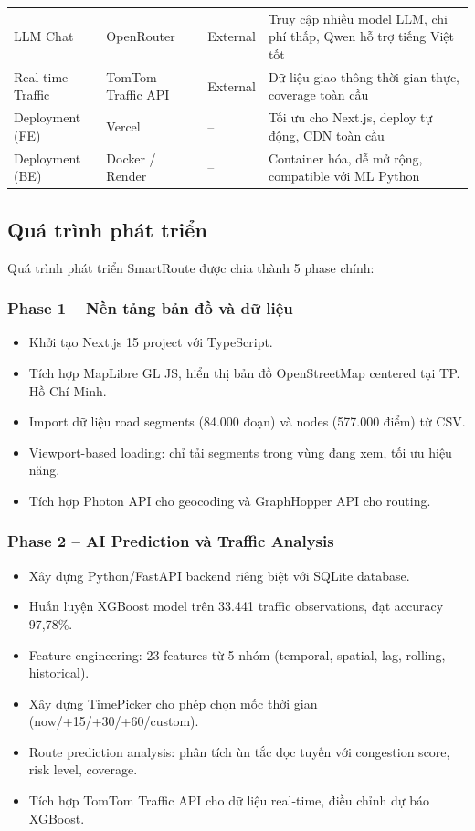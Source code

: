 \documentclass[12pt,a4paper]{article}
\begin{document}
\begin{table}[H]
\begin{tabularx}{\textwidth}{L{3cm}L{3cm}L{1.2cm}Y}
LLM Chat & OpenRouter & External & Truy cập nhiều model LLM, chi phí thấp, Qwen hỗ trợ tiếng Việt tốt \\[4pt]
Real-time Traffic & TomTom Traffic API & External & Dữ liệu giao thông thời gian thực, coverage toàn cầu \\[4pt]
Deployment (FE) & Vercel & -- & Tối ưu cho Next.js, deploy tự động, CDN toàn cầu \\[4pt]
Deployment (BE) & Docker / Render & -- & Container hóa, dễ mở rộng, compatible với ML Python \\
\bottomrule
\end{tabularx}
\end{table}

\subsection{Quá trình phát triển}
Quá trình phát triển SmartRoute được chia thành 5 phase chính:

\subsubsection{Phase 1 -- Nền tảng bản đồ và dữ liệu}
\begin{itemize}[leftmargin=1.2cm]
    \item Khởi tạo Next.js 15 project với TypeScript.
    \item Tích hợp MapLibre GL JS, hiển thị bản đồ OpenStreetMap centered tại TP. Hồ Chí Minh.
    \item Import dữ liệu road segments (84.000 đoạn) và nodes (577.000 điểm) từ CSV.
    \item Viewport-based loading: chỉ tải segments trong vùng đang xem, tối ưu hiệu năng.
    \item Tích hợp Photon API cho geocoding và GraphHopper API cho routing.
\end{itemize}

\subsubsection{Phase 2 -- AI Prediction và Traffic Analysis}
\begin{itemize}[leftmargin=1.2cm]
    \item Xây dựng Python/FastAPI backend riêng biệt với SQLite database.
    \item Huấn luyện XGBoost model trên 33.441 traffic observations, đạt accuracy 97,78\%.
    \item Feature engineering: 23 features từ 5 nhóm (temporal, spatial, lag, rolling, historical).
    \item Xây dựng TimePicker cho phép chọn mốc thời gian (now/+15/+30/+60/custom).
    \item Route prediction analysis: phân tích ùn tắc dọc tuyến với congestion score, risk level, coverage.
    \item Tích hợp TomTom Traffic API cho dữ liệu real-time, điều chỉnh dự báo XGBoost.
\end{itemize}
\end{document}
